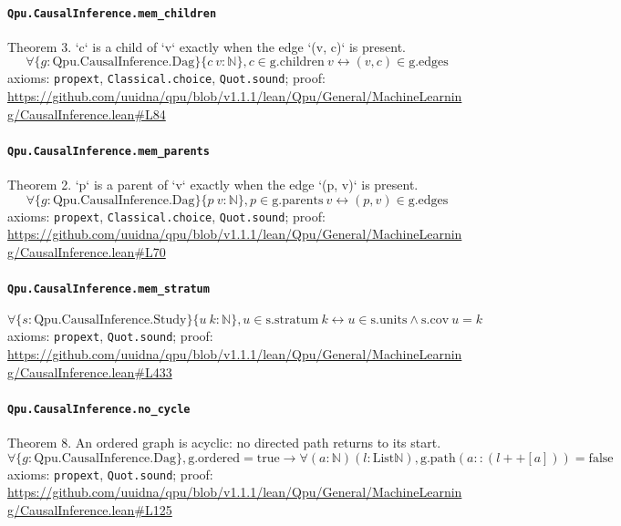 \documentclass[11pt]{article}
\begin{document}
\paragraph{\texttt{Qpu.CausalInference.mem\_children}}
Theorem 3. `c` is a child of `v` exactly when the edge `(v, c)` is present.
\[ \forall \{g : \mathrm{Qpu.CausalInference.Dag}\} \{c\ v : \mathbb{N}\}, c \in \mathrm{g.children}\ v \leftrightarrow (v, c) \in \mathrm{g.edges} \]
\noindent axioms: \texttt{propext}, \texttt{Classical.choice}, \texttt{Quot.sound}; proof: \url{https://github.com/uuidna/qpu/blob/v1.1.1/lean/Qpu/General/MachineLearning/CausalInference.lean\#L84}

\paragraph{\texttt{Qpu.CausalInference.mem\_parents}}
Theorem 2. `p` is a parent of `v` exactly when the edge `(p, v)` is present.
\[ \forall \{g : \mathrm{Qpu.CausalInference.Dag}\} \{p\ v : \mathbb{N}\}, p \in \mathrm{g.parents}\ v \leftrightarrow (p, v) \in \mathrm{g.edges} \]
\noindent axioms: \texttt{propext}, \texttt{Classical.choice}, \texttt{Quot.sound}; proof: \url{https://github.com/uuidna/qpu/blob/v1.1.1/lean/Qpu/General/MachineLearning/CausalInference.lean\#L70}

\paragraph{\texttt{Qpu.CausalInference.mem\_stratum}}
\[ \forall \{s : \mathrm{Qpu.CausalInference.Study}\} \{u\ k : \mathbb{N}\}, u \in \mathrm{s.stratum}\ k \leftrightarrow u \in \mathrm{s.units} \land \mathrm{s.cov}\ u = k \]
\noindent axioms: \texttt{propext}, \texttt{Quot.sound}; proof: \url{https://github.com/uuidna/qpu/blob/v1.1.1/lean/Qpu/General/MachineLearning/CausalInference.lean\#L433}

\paragraph{\texttt{Qpu.CausalInference.no\_cycle}}
Theorem 8. An ordered graph is acyclic: no directed path returns to its start.
\[ \forall \{g : \mathrm{Qpu.CausalInference.Dag}\}, \mathrm{g.ordered} = \mathrm{true} \to \forall (a : \mathbb{N}) (l : \mathrm{List} \mathbb{N}), \mathrm{g.path} (a :: (l ++ [a])) = \mathrm{false} \]
\noindent axioms: \texttt{propext}, \texttt{Quot.sound}; proof: \url{https://github.com/uuidna/qpu/blob/v1.1.1/lean/Qpu/General/MachineLearning/CausalInference.lean\#L125}
\end{document}
